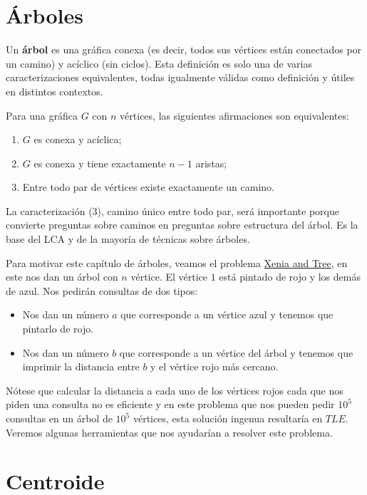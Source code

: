 \section{Árboles}
 
Un \textbf{árbol} es una gráfica conexa (es decir, todos sus vértices están conectados por un camino) y acíclico (sin ciclos). Esta definición es solo una de varias caracterizaciones equivalentes, todas igualmente válidas como definición y útiles en distintos contextos.
 
Para una gráfica $G$ con $n$ vértices, las siguientes afirmaciones son equivalentes:
\begin{enumerate}
    \item $G$ es conexa y acíclica;
    \item $G$ es conexa y tiene exactamente $n-1$ aristas;
    \item Entre todo par de vértices existe exactamente un camino.
\end{enumerate}
 
La caracterización (3), camino único entre todo par, será importante porque convierte preguntas sobre caminos en preguntas sobre estructura del árbol. Es la base del LCA y de la mayoría de técnicas sobre árboles.
 
Para motivar este capítulo de árboles, veamos el problema \href{https://codeforces.com/contest/342/problem/E}{Xenia and Tree}, en este nos dan un árbol con $n$ vértice. El vértice $1$ está pintado de rojo y los demás de azul. Nos pedirán consultas de dos tipos:
\begin{itemize}
    \item[1.] Nos dan un número $a$ que corresponde a un vértice azul y tenemos que pintarlo de rojo.
    \item[2.] Nos dan un número $b$ que corresponde a un vértice del árbol y tenemos que imprimir la distancia entre $b$ y el vértice rojo más cercano.
\end{itemize}
Nótese que calcular la distancia a cada uno de los vértices rojos cada que nos piden una consulta no es eficiente y en este problema que nos pueden pedir $10^5$ consultas en un árbol de $10^5$ vértices, esta solución ingenua resultaría en $TLE$. Veremos algunas herramientas que nos ayudarían a resolver este problema.

\section{Centroide\adv}
 
